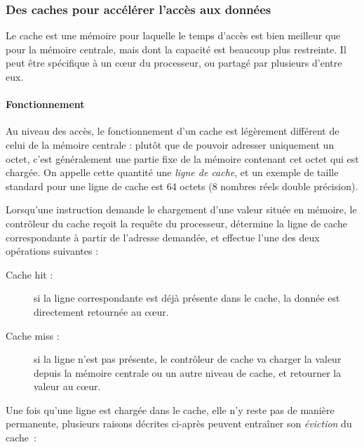 \subsubsection{Des caches pour accélérer l'accès aux données}\label{sec:context:numa:cache}

Le cache est une mémoire pour laquelle le temps d'accès est bien meilleur que pour la mémoire centrale, mais dont la capacité est beaucoup plus restreinte. Il peut être spécifique à un cœur du processeur, ou partagé par plusieurs d'entre eux.

\paragraph{Fonctionnement}

Au niveau des accès, le fonctionnement d'un cache est légèrement différent de celui de la mémoire centrale : plutôt que de pouvoir adresser uniquement un octet, c'est généralement une partie fixe de la mémoire contenant cet octet qui est chargée.
On appelle cette quantité une \emph{ligne de cache}, et un exemple de taille standard pour une ligne de cache est 64 octets (8 nombres réels double précision).

Lorsqu'une instruction demande le chargement d'une valeur située en mémoire, le contrôleur du cache reçoit la requête du processeur, détermine la ligne de cache correspondante à partir de l'adresse demandée, et effectue l'une des deux opérations suivantes :
\begin{description}
  \item [Cache hit :] si la ligne correspondante est déjà présente dans le cache, la donnée est directement retournée au cœur.
  \item [Cache miss :] si la ligne n'est pas présente, le contrôleur de cache va charger la valeur depuis la mémoire centrale ou un autre niveau de cache, et retourner la valeur au cœur.
\end{description}

Une fois qu'une ligne est chargée dans le cache, elle n'y reste pas de manière permanente, plusieurs raisons décrites ci-après peuvent entraîner son \emph{éviction} du cache~:

